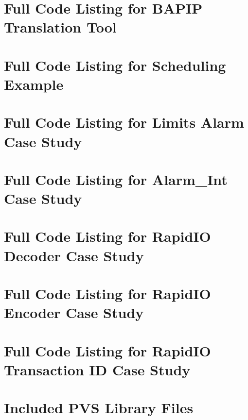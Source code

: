 

\begin{singlespace}

\chapter{Full Code Listing for BAPIP Translation Tool} \label{app:bapipsrc}


\chapter{Full Code Listing for Scheduling Example} \label{app:schedex}


\chapter{Full Code Listing for Limits Alarm Case Study} \label{app:limits}


\chapter{Full Code Listing for Alarm\_Int Case Study} \label{app:alarm}


\chapter{Full Code Listing for RapidIO Decoder Case Study} \label{app:decode}


\chapter{Full Code Listing for RapidIO Encoder Case Study} \label{app:encode}


\chapter{Full Code Listing for RapidIO Transaction ID Case Study} \label{app:tid}


\chapter{Included PVS Library Files} \label{app:schedex:pvslib}


\end{singlespace}
